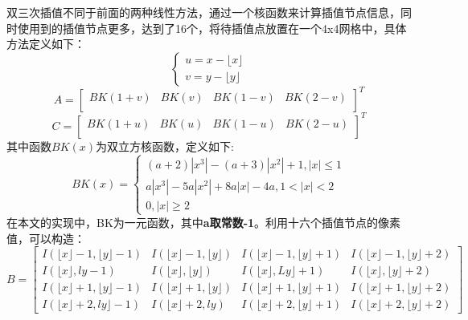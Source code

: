 \documentclass[UTF8]{ctexart}
\begin{document}
\begin{itemize}
    双三次插值不同于前面的两种线性方法，通过一个核函数来计算插值节点信息，同时使用到的插值节点更多，达到了16个，将待插值点放置在一个4x4网格中，具体方法定义如下：
    \begin{equation}
        \begin{cases}
            u=x-\lfloor x\rfloor\\
            v=y-\lfloor y\rfloor
        \end{cases}
    \end{equation}
    \begin{equation}
        A = \left[
        \begin{matrix}
            BK(1+v) & BK(v) & BK(1-v) & BK(2-v)\\
        \end{matrix}    
        \right]^T
    \end{equation}
    \begin{equation}
        C = \left[
        \begin{matrix}
            BK(1+u) & BK(u) & BK(1-u) & BK(2-u)\\
        \end{matrix}    
        \right]^T        
    \end{equation}
    其中函数$BK(x)$为双立方核函数，定义如下:
    \begin{equation}
        BK(x)=\begin{cases}
            (a+2)|x^3|-(a+3)|x^2|+1, |x|\leq 1\\
            a|x^3|-5a|x^2|+8a|x|-4a, 1<|x|<2\\
            0, |x|\geq 2
        \end{cases}
    \end{equation}
在本文的实现中，BK为一元函数，其中\textbf{a取常数-1}。利用十六个插值节点的像素值，可以构造：
$$
    B=\left[\begin{array}{cccc}{I(\lfloor x\rfloor- 1,\lfloor y\rfloor- 1)} & {I(\lfloor x\rfloor- 1,\lfloor y\rfloor)} & {I(\lfloor x\rfloor- 1,\lfloor y\rfloor+ 1)} & {I(\lfloor x\rfloor- 1,\lfloor y\rfloor+ 2)} \\ {I(\lfloor x\rfloor, l y-1)} & {I(\lfloor x\rfloor, \lfloor y\rfloor)} & {I(\lfloor x\rfloor, L y\rfloor+ 1)} & {I(\lfloor x\rfloor,\lfloor y\rfloor+ 2)} \\ {I(\lfloor x\rfloor+ 1,\lfloor y\rfloor- 1)} & {I(\lfloor x\rfloor+ 1,\lfloor y\rfloor)} & {I(\lfloor x\rfloor+ 1,\lfloor y\rfloor+ 1)} & {I(\lfloor x\rfloor+ 1, \lfloor y\rfloor+ 2)} \\ {I(\lfloor x\rfloor+ 2, l y\rfloor- 1)} & {I(\lfloor x\rfloor+ 2, l y)} & {I(\lfloor x\rfloor+ 2,\lfloor y\rfloor+ 1)} & {I(\lfloor x\rfloor+ 2,\lfloor y\rfloor+ 2)}\end{array}\right]
$$


\end{itemize}
\end{document}

